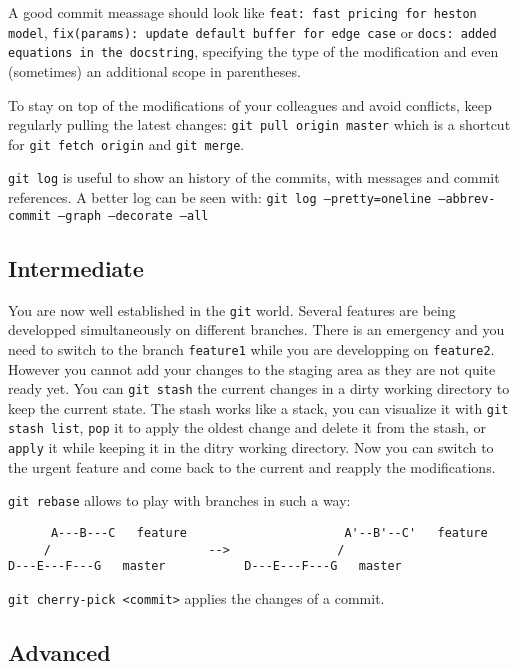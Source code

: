 A good commit meassage should look like \texttt{feat: fast pricing for heston model}, \texttt{fix(params): update default buffer for edge case} or \texttt{docs: added equations in the docstring}, specifying the type of the modification and even (sometimes) an additional scope in parentheses.

To stay on top of the modifications of your colleagues and avoid conflicts, keep regularly pulling the latest changes:\newline
\texttt{git pull origin master}\newline
which is a shortcut for \texttt{git fetch origin} and \texttt{git merge}.

\texttt{git log} is useful to show an history of the commits, with messages and commit references. A better log can be seen with:\newline
\texttt{git log --pretty=oneline --abbrev-commit --graph --decorate --all}

\subsection*{Intermediate}

You are now well established in the \texttt{git} world. Several features are being developped simultaneously on different branches. There is an emergency and you need to switch to the branch \texttt{feature1} while you are developping on \texttt{feature2}. However you cannot add your changes to the staging area as they are not quite ready yet. You can \texttt{git stash} the current changes in a dirty working directory to keep the current state. The stash works like a stack, you can visualize it with \texttt{git stash list}, \texttt{pop} it to apply the oldest change and delete it from the stash, or \texttt{apply} it while keeping it in the ditry working directory. Now you can switch to the urgent feature and come back to the current and reapply the modifications.

\texttt{git rebase} allows to play with branches in such a way:

\begin{center}
\begin{verbatim}
      A---B---C   feature                      A'--B'--C'   feature
     /                      -->               /          
D---E---F---G   master           D---E---F---G   master   
\end{verbatim}
\end{center}

\texttt{git cherry-pick <commit>} applies the changes of a commit.


\subsection*{Advanced}